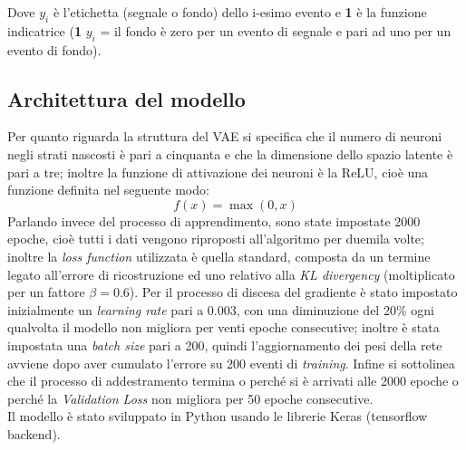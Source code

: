 Dove $y_{i}$ è l'etichetta (segnale o fondo) dello i-esimo evento e \textbf{1} è la funzione indicatrice (\textbf{1} {$y_{i}$ = il fondo} è zero per un evento di segnale e pari ad uno per un evento di fondo).
\color{black}

\newpage




\subsection{Architettura del modello}
\label{architettura del modello}
Per quanto riguarda la struttura del VAE si specifica che il numero di neuroni negli strati nascosti è pari a cinquanta e che la dimensione dello spazio latente è pari a tre; inoltre la funzione di attivazione dei neuroni è la ReLU, cioè una funzione definita nel seguente modo:
\begin{equation}
	f(x) = \max(0,x)
\end{equation} 
Parlando invece del processo di apprendimento, sono state impostate 2000 epoche, cioè tutti i dati vengono riproposti all'algoritmo per duemila volte; inoltre la \textit{loss function} utilizzata è quella standard, composta da un termine legato all'errore di ricostruzione ed uno relativo alla \textit{KL divergency} (moltiplicato per un fattore $\beta=0.6$). Per il processo di discesa del gradiente è stato impostato inizialmente un \textit{learning rate} pari a 0.003, con una diminuzione del 20\% ogni qualvolta il modello non migliora per venti epoche consecutive; inoltre è stata impostata una \textit{batch size} pari a 200, quindi l'aggiornamento dei pesi della rete avviene dopo aver cumulato l'errore su 200 eventi di \textit{training}. Infine si sottolinea che il processo di addestramento termina o perché si è arrivati alle 2000 epoche o perché la \textit{Validation Loss} non migliora per 50 epoche consecutive.\\
Il modello è stato sviluppato in Python usando le librerie Keras (tensorflow backend).


